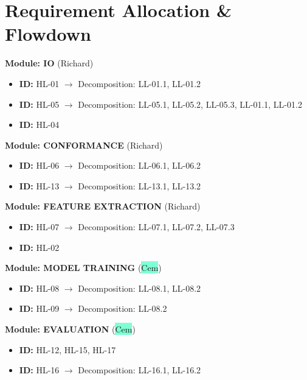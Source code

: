\documentclass[12pt,a4paper]{article}
\begin{document}
\section{Requirement Allocation \& Flowdown}

\noindent \textbf{Module: IO} (\colorbox{BurntOrange}{Richard}) %
\begin{itemize}
    \item \textbf{ID:} HL-01 $\rightarrow$ Decomposition: LL-01.1, LL-01.2
    \item \textbf{ID:} HL-05 $\rightarrow$ Decomposition: LL-05.1, LL-05.2, LL-05.3, LL-01.1, LL-01.2
    \item \textbf{ID:} HL-04
\end{itemize}

\noindent \textbf{Module: CONFORMANCE} (\colorbox{BurntOrange}{Richard}) %
\begin{itemize}
    \item \textbf{ID:} HL-06 $\rightarrow$ Decomposition: LL-06.1, LL-06.2
    \item \textbf{ID:} HL-13 $\rightarrow$ Decomposition: LL-13.1, LL-13.2
\end{itemize}

\noindent \textbf{Module: FEATURE EXTRACTION} (\colorbox{BurntOrange}{Richard}) %
\begin{itemize}
    \item \textbf{ID:} HL-07 $\rightarrow$ Decomposition: LL-07.1, LL-07.2, LL-07.3
    \item \textbf{ID:} HL-02
\end{itemize}

\noindent \textbf{Module: MODEL TRAINING} (\colorbox{Aquamarine}{Cem}) %
\begin{itemize}
    \item \textbf{ID:} HL-08 $\rightarrow$ Decomposition: LL-08.1, LL-08.2
    \item \textbf{ID:} HL-09 $\rightarrow$ Decomposition: LL-08.2
\end{itemize}

\noindent \textbf{Module: EVALUATION} (\colorbox{Aquamarine}{Cem}) %
\begin{itemize}
    \item \textbf{ID:} HL-12, HL-15, HL-17
    \item \textbf{ID:} HL-16 $\rightarrow$ Decomposition: LL-16.1, LL-16.2
\end{itemize}
\end{document}

